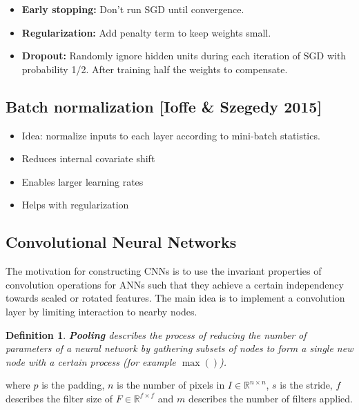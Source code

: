 \documentclass[8pt,a4paper]{scrartcl}
\newtheorem{define}{Definition}
\begin{document}
\begin{multicols*}{3}
\begin{itemize}
\ncompaq
\item \textbf{Early stopping:} Don't run SGD until convergence.
\item \textbf{Regularization:} Add penalty term to keep weights small.
\item \textbf{Dropout:} Randomly ignore hidden units during each iteration of SGD with probability 1/2. After training half the weights to compensate.
\end{itemize}

\subsection{Batch normalization [Ioffe \& Szegedy 2015]}

\begin{itemize}
\ncompaq
\item Idea: normalize inputs to each layer according to mini-batch statistics.
\item Reduces internal covariate shift
\item Enables larger learning rates
\item Helps with regularization
\end{itemize}

\subsection{Convolutional Neural Networks}

The motivation for constructing CNNs is to use the invariant properties of convolution operations for ANNs such that they achieve a certain independency towards scaled or rotated features. The main idea is to implement a convolution layer by limiting interaction to nearby nodes.

\begin{define}
\textbf{Pooling} describes the process of reducing the number of parameters of a neural network by gathering subsets of nodes to form a single new node with a certain process (for example $\max()$).
\end{define}


where $p$ is the padding, $n$ is the number of pixels in $I\in\mathbb{R}^{n\times n}$, $s$ is the stride, $f$ describes the filter size of $F\in\mathbb{R}^{f\times f}$ and $m$ describes the number of filters applied.


\end{multicols*}
\end{document}
